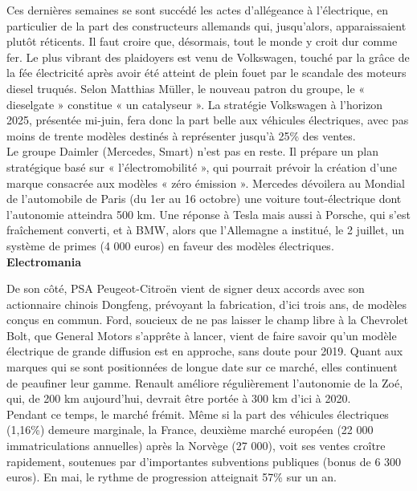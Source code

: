 \documentclass[8pt]{article}
\begin{document}
Ces dernières semaines se sont succédé les actes d’allégeance à l’électrique, en particulier de la part des constructeurs allemands qui, jusqu’alors, apparaissaient plutôt réticents. Il faut croire que, désormais, tout le monde y croit dur comme fer. Le plus vibrant des plaidoyers est venu de Volkswagen, touché par la grâce de la fée électricité après avoir été atteint de plein fouet par le scandale des moteurs diesel truqués. Selon Matthias Müller, le nouveau patron du groupe, le « dieselgate » constitue « un catalyseur ». La stratégie Volkswagen à l’horizon 2025, présentée mi-juin, fera donc la part belle aux véhicules électriques, avec pas moins de trente modèles destinés à représenter jusqu’à 25\% des ventes. \\

Le groupe Daimler (Mercedes, Smart) n’est pas en reste. Il prépare un plan stratégique basé sur « l’électromobilité », qui pourrait prévoir la création d’une marque consacrée aux modèles « zéro émission ». Mercedes dévoilera au Mondial de l’automobile de Paris (du 1er au 16 octobre) une voiture tout-électrique dont l’autonomie atteindra 500 km. Une réponse à Tesla mais aussi à Porsche, qui s’est fraîchement converti, et à BMW, alors que l’Allemagne a institué, le 2 juillet, un système de primes (4 000 euros) en faveur des modèles électriques.  \\

\textbf{Electromania}

De son côté, PSA Peugeot-Citroën vient de signer deux accords avec son actionnaire chinois Dongfeng, prévoyant la fabrication, d’ici trois ans, de modèles conçus en commun. Ford, soucieux de ne pas laisser le champ libre à la Chevrolet Bolt, que General Motors s’apprête à lancer, vient de faire savoir qu’un modèle électrique de grande diffusion est en approche, sans doute pour 2019. Quant aux marques qui se sont positionnées de longue date sur ce marché, elles continuent de peaufiner leur gamme. Renault améliore régulièrement l’autonomie de la Zoé, qui, de 200 km aujourd’hui, devrait être portée à 300 km d’ici à 2020.  \\

Pendant ce temps, le marché frémit. Même si la part des véhicules électriques (1,16\%) demeure marginale, la France, deuxième marché européen (22 000 immatriculations annuelles) après la Norvège (27 000), voit ses ventes croître rapidement, soutenues par d’importantes subventions publiques (bonus de 6 300 euros). En mai, le rythme de progression atteignait 57\% sur un an.  \\
\end{document}
